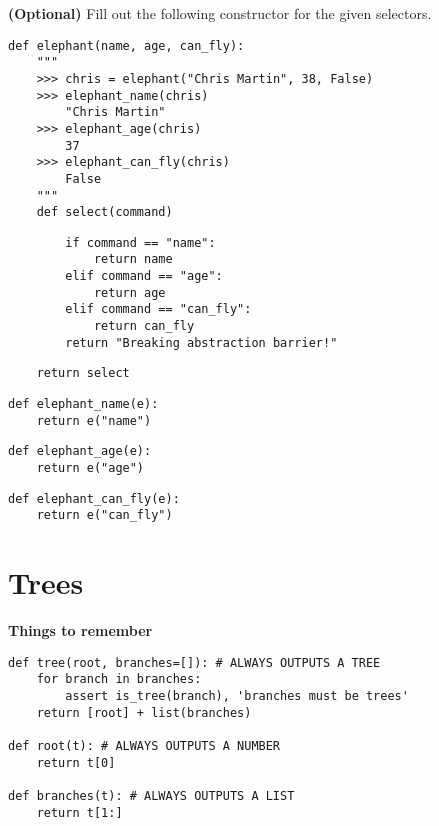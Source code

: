 \documentclass{exam}
\begin{document}
\begin{questions}
\begin{blocksection}
\end{blocksection}

\begin{blocksection}
\question \textbf{(Optional)} Fill out the following constructor for the given
selectors.

\begin{lstlisting}
def elephant(name, age, can_fly):
    """
    >>> chris = elephant("Chris Martin", 38, False)
    >>> elephant_name(chris)
        "Chris Martin"
    >>> elephant_age(chris)
        37
    >>> elephant_can_fly(chris)
        False
    """
    def select(command)
\end{lstlisting}
\begin{solution}[3in]
\begin{lstlisting}
        if command == "name":
            return name
        elif command == "age":
            return age
        elif command == "can_fly":
            return can_fly
        return "Breaking abstraction barrier!"
\end{lstlisting}
\end{solution}

\begin{lstlisting}
    return select
\end{lstlisting}

\begin{lstlisting}
def elephant_name(e):
    return e("name")
\end{lstlisting}

\begin{lstlisting}
def elephant_age(e):
    return e("age")
\end{lstlisting}

\begin{lstlisting}
def elephant_can_fly(e):
    return e("can_fly")
\end{lstlisting}

\end{blocksection}

\end{questions}

\newpage
\section{Trees}
\textbf{Things to remember}
\begin{lstlisting}
def tree(root, branches=[]): # ALWAYS OUTPUTS A TREE
    for branch in branches:
        assert is_tree(branch), 'branches must be trees'
    return [root] + list(branches)

def root(t): # ALWAYS OUTPUTS A NUMBER
    return t[0]

def branches(t): # ALWAYS OUTPUTS A LIST
    return t[1:]
\end{lstlisting}
\end{document}
